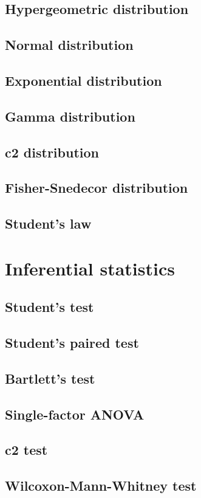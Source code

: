 \documentclass{report}
\begin{document}
	\section{Hypergeometric distribution}
	\section{Normal distribution}
	\section{Exponential distribution}
	\section{Gamma distribution}
	\section{c2 distribution}
	\section{Fisher-Snedecor distribution}
	\section{Student’s law}

\chapter{Inferential statistics}
	\section{Student’s test}
	\section{Student’s paired test}
	\section{Bartlett’s test}
	\section{Single-factor ANOVA}
	\section{c2 test}
	\section{Wilcoxon-Mann-Whitney test}
\end{document}
